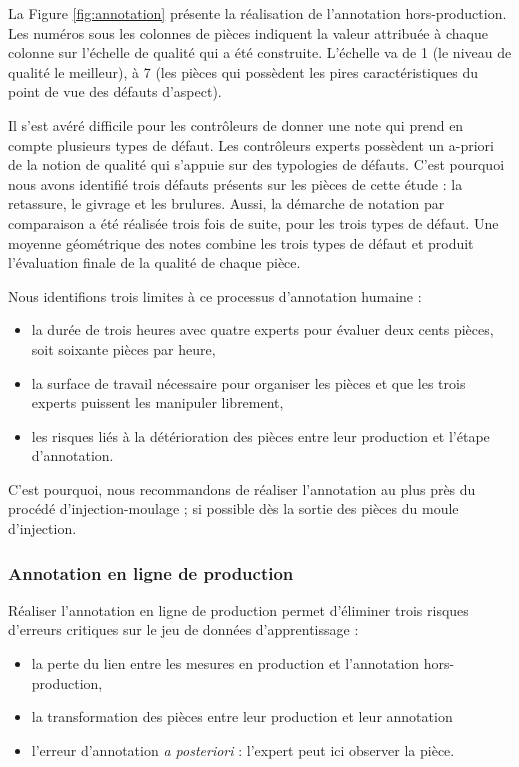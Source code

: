 La Figure \ref{fig:annotation} présente la réalisation de l'annotation hors-production.
Les numéros sous les colonnes de pièces indiquent la valeur attribuée à chaque colonne sur l'échelle de qualité qui a été construite.
L'échelle va de 1 (le niveau de qualité le meilleur), à 7 (les pièces qui possèdent les pires caractéristiques du point de vue des défauts d'aspect).

Il s'est avéré difficile pour les contrôleurs de donner une note qui prend en compte plusieurs types de défaut.
Les contrôleurs experts possèdent un a-priori de la notion de qualité qui s'appuie sur des typologies de défauts.
C'est pourquoi nous avons identifié trois défauts présents sur les pièces de cette étude : la retassure, le givrage et les brulures.
Aussi, la démarche de notation par comparaison a été réalisée trois fois de suite, pour les trois types de défaut.
Une moyenne géométrique des notes combine les trois types de défaut et produit l'évaluation finale de la qualité de chaque pièce.

\noindent
Nous identifions trois limites à ce processus d'annotation humaine :
\begin{itemize}
	\item la durée de trois heures avec quatre experts pour évaluer deux cents pièces, soit soixante pièces par heure,  %
	\item la surface de travail nécessaire pour organiser les pièces et que les trois experts puissent les manipuler librement,
	\item les risques liés à la détérioration des pièces entre leur production et l'étape d'annotation.
\end{itemize}
C'est pourquoi, nous recommandons de réaliser l'annotation au plus près du procédé d'injection-moulage ; si possible dès la sortie des pièces du moule d'injection.

\subsubsection{Annotation en ligne de production} \label{subsubsec:online_annoting}
Réaliser l'annotation en ligne de production permet d'éliminer trois risques d'erreurs critiques sur le jeu de données d'apprentissage :
\begin{itemize}
	\item la perte du lien entre les mesures en production et l'annotation hors-production,
	\item la transformation des pièces entre leur production et leur annotation
	\item l'erreur d'annotation \textit{a posteriori} : l'expert peut ici observer la pièce.
\end{itemize}

